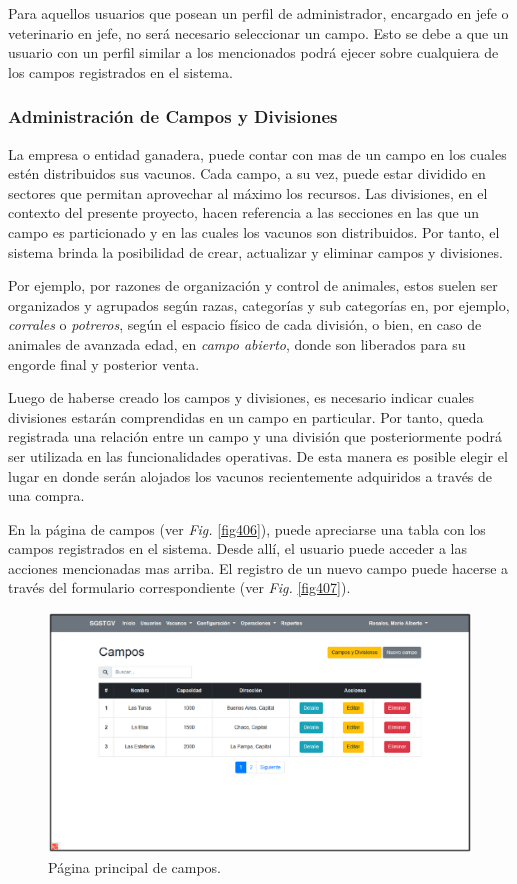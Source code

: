 \documentclass[11pt,oneside]{book}
\begin{document}
\newpage
Para aquellos usuarios que posean un perfil de administrador, encargado en jefe o veterinario en jefe, no será necesario seleccionar un campo. Esto se debe a que un usuario con un perfil similar a los mencionados podrá ejecer sobre cualquiera de los campos registrados en el sistema.

\subsubsection{Administración de Campos y Divisiones}
La empresa o entidad ganadera, puede contar con mas de un campo en los cuales estén distribuidos sus vacunos. Cada campo, a su vez, puede estar dividido en sectores que permitan aprovechar al máximo los recursos. Las divisiones, en el contexto del presente proyecto, hacen referencia a las secciones en las que un campo es particionado y en las cuales los vacunos son distribuidos. Por tanto, el sistema brinda la posibilidad de crear, actualizar y eliminar campos y divisiones. 

 Por ejemplo, por razones de organización y control de animales, estos suelen ser organizados y agrupados según razas, categorías y sub categorías en, por ejemplo, \textit{corrales} o \textit{potreros}, según el espacio físico de cada división, o bien, en caso de animales de avanzada edad, en \textit{campo abierto}, donde son liberados para su engorde final y posterior venta.

Luego de haberse creado los campos y divisiones, es necesario indicar cuales divisiones estarán comprendidas en un campo en particular. Por tanto, queda registrada una relación entre un campo y una división que posteriormente podrá ser utilizada en las funcionalidades operativas. De esta manera es posible elegir el lugar en donde serán alojados los vacunos recientemente adquiridos a través de una compra.

En la página de campos (ver \textit{Fig.} \eqref{fig406}), puede apreciarse una tabla con los campos registrados en el sistema. Desde allí, el usuario puede acceder a las acciones mencionadas mas arriba. El registro de un nuevo campo puede hacerse a través del formulario correspondiente (ver \textit{Fig.} \eqref{fig407}). 

\begin{figure}[tbhp]
\centerline{\includegraphics[scale=0.87]{figs/capitulo_4_desarrollo/fig406.pdf}}
\caption{Página principal de campos.}
\label{fig406}
\end{figure}
\end{document}
